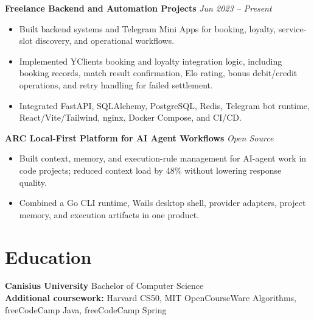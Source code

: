 \documentclass[10pt,a4paper]{article}
\begin{document}
\textbf{Freelance Backend and Automation Projects} \hfill \textit{Jun 2023 -- Present}
\begin{itemize}
  \item Built backend systems and Telegram Mini Apps for booking, loyalty, service-slot discovery, and operational workflows.
  \item Implemented YClients booking and loyalty integration logic, including booking records, match result confirmation, Elo rating, bonus debit/credit operations, and retry handling for failed settlement.
  \item Integrated FastAPI, SQLAlchemy, PostgreSQL, Redis, Telegram bot runtime, React/Vite/Tailwind, nginx, Docker Compose, and CI/CD.
\end{itemize}

\textbf{ARC \textbar{} Local-First Platform for AI Agent Workflows} \hfill \textit{Open Source}
\begin{itemize}
  \item Built context, memory, and execution-rule management for AI-agent work in code projects; reduced context load by 48\% without lowering response quality.
  \item Combined a Go CLI runtime, Wails desktop shell, provider adapters, project memory, and execution artifacts in one product.
\end{itemize}

\section*{Education}
\textbf{Canisius University} \textbar{} Bachelor of Computer Science\\
\textbf{Additional coursework:} Harvard CS50, MIT OpenCourseWare Algorithms, freeCodeCamp Java, freeCodeCamp Spring
\end{document}

